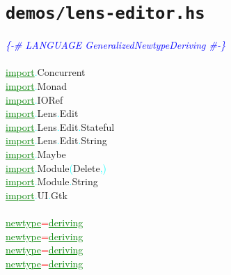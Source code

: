 \section{\texttt{demos/lens-editor.hs}}
\label{mod:lens-editor}
\textcolor{blue}{{\it{}\{-\# LANGUAGE GeneralizedNewtypeDeriving \#-\}}}\\\\\textcolor{green}{\underline{import}}\textcolor{cyan}{.}{\rm{}Concurrent}\\\textcolor{green}{\underline{import}}\textcolor{cyan}{.}{\rm{}Monad}\\\textcolor{green}{\underline{import}}\textcolor{cyan}{.}{\rm{}IORef}\\\textcolor{green}{\underline{import}}\textcolor{cyan}{.}{\rm{}Lens}\textcolor{cyan}{.}{\rm{}Edit}\\\textcolor{green}{\underline{import}}\textcolor{cyan}{.}{\rm{}Lens}\textcolor{cyan}{.}{\rm{}Edit}\textcolor{cyan}{.}{\rm{}Stateful}\\\textcolor{green}{\underline{import}}\textcolor{cyan}{.}{\rm{}Lens}\textcolor{cyan}{.}{\rm{}Edit}\textcolor{cyan}{.}{\rm{}String}\\\textcolor{green}{\underline{import}}\textcolor{cyan}{.}{\rm{}Maybe}\\\textcolor{green}{\underline{import}}\textcolor{cyan}{.}{\rm{}Module}\hsspace \textcolor{cyan}{(}{\rm{}Delete}\textcolor{cyan}{,}\textcolor{cyan}{)}\\\textcolor{green}{\underline{import}}\textcolor{cyan}{.}{\rm{}Module}\textcolor{cyan}{.}{\rm{}String}\\\textcolor{green}{\underline{import}}\textcolor{cyan}{.}{\rm{}UI}\textcolor{cyan}{.}{\rm{}Gtk}\\\\\textcolor{green}{\underline{newtype}}\hsspace \hsspace \hsspace \hsspace \hsspace \hsspace \textcolor{red}{=}\hsspace \hsspace \hsspace \hsspace \hsspace \hsspace {\rm{}()}\hsspace \textcolor{green}{\underline{deriving}}\\\textcolor{green}{\underline{newtype}}\hsspace \hsspace \hsspace \textcolor{red}{=}\hsspace \hsspace \hsspace {\rm{}()}\hsspace \textcolor{green}{\underline{deriving}}\\\textcolor{green}{\underline{newtype}}\hsspace \hsspace \hsspace \hsspace \hsspace \textcolor{red}{=}\hsspace \hsspace \hsspace \hsspace \hsspace {\rm{}()}\hsspace \textcolor{green}{\underline{deriving}}\\\textcolor{green}{\underline{newtype}}\hsspace \textcolor{red}{=}\hsspace {\rm{}()}\hsspace \textcolor{green}{\underline{deriving}}\hsspace 